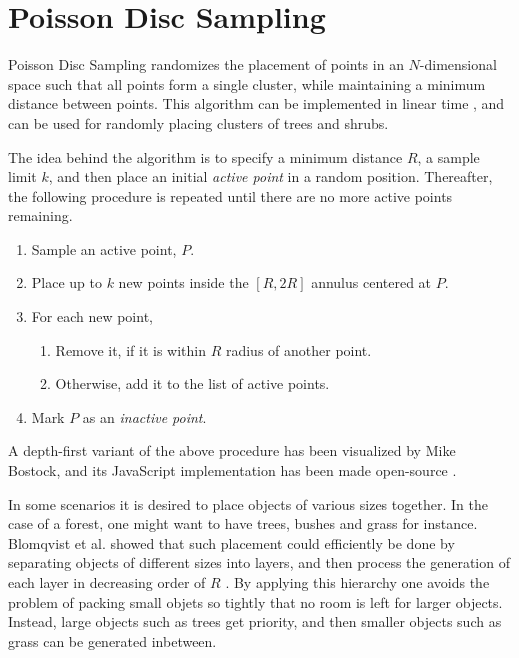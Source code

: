 \section{Poisson Disc Sampling}

Poisson Disc Sampling randomizes the placement of points in an $N$-dimensional space such that all points form a single cluster, while maintaining a minimum distance between points.
This algorithm can be implemented in linear time \cite{poisson_fast}, and can be used for randomly placing clusters of trees and shrubs.


The idea behind the algorithm is to specify a minimum distance $R$, a sample limit $k$, and then place an initial \textit{active point} in a random position.
Thereafter, the following procedure is repeated until there are no more active points remaining.
\begin{enumerate}
  \item Sample an active point, $P$.
  \item Place up to $k$ new points inside the $[R, 2R]$ annulus centered at $P$.
  \item For each new point,
  \begin{enumerate}
    \item Remove it, if it is within $R$ radius of another point.
    \item Otherwise, add it to the list of active points.
  \end{enumerate}
  \item Mark $P$ as an \textit{inactive point}.
\end{enumerate}

A depth-first variant of the above procedure has been visualized by Mike Bostock, and its JavaScript implementation has been made open-source \cite{poisson_demo}.

In some scenarios it is desired to place objects of various sizes together.
In the case of a forest, one might want to have trees, bushes and grass for instance.
Blomqvist et al. showed that such placement could efficiently be done by separating objects of different sizes into layers, and then process the generation of each layer in decreasing order of $R$ \cite[p.32]{ba_landscape}.
By applying this hierarchy one avoids the problem of packing small objets so tightly that no room is left for larger objects.
Instead, large objects such as trees get priority, and then smaller objects such as grass can be generated inbetween.